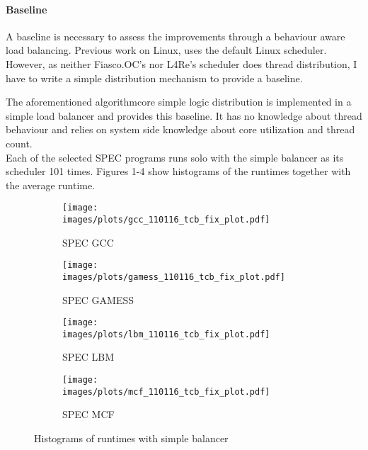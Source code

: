 
\paragraph{Baseline}

A baseline is necessary to assess the improvements through a behaviour aware
load balancing.
Previous work on Linux, uses the default Linux scheduler.
However, as neither Fiasco.OC's nor L4Re's scheduler does thread distribution,
I have to write a simple distribution mechanism to provide a baseline.

The aforementioned algorithmcore simple logic distribution is implemented in a
simple load balancer and provides this baseline.
It has no knowledge about thread behaviour and relies on system side
knowledge about core utilization and thread count.
\\

Each of the selected SPEC programs runs solo with the simple balancer as its
scheduler 101 times.
Figures 1-4 show histograms of the runtimes together with the average runtime.

\begin{figure}[h!]
  \begin{subfigure}{.49\textwidth}
    \texttt{[image: images/plots/gcc\_110116\_tcb\_fix\_plot.pdf]}
    \caption{SPEC GCC}
    \label{baseline:gcc}
  \end{subfigure}
  \begin{subfigure}{.49\textwidth}
    \texttt{[image: images/plots/gamess\_110116\_tcb\_fix\_plot.pdf]}
    \caption{SPEC GAMESS}
    \label{baseline:gamess}
  \end{subfigure}
  \begin{subfigure}{.49\textwidth}
    \texttt{[image: images/plots/lbm\_110116\_tcb\_fix\_plot.pdf]}
    \caption{SPEC LBM}
    \label{baseline:gcc}
  \end{subfigure}
  \begin{subfigure}{.49\textwidth}
    \texttt{[image: images/plots/mcf\_110116\_tcb\_fix\_plot.pdf]}
    \caption{SPEC MCF}
    \label{baseline:gamess}
  \end{subfigure}
  \caption{Histograms of runtimes with simple balancer}
\end{figure}
